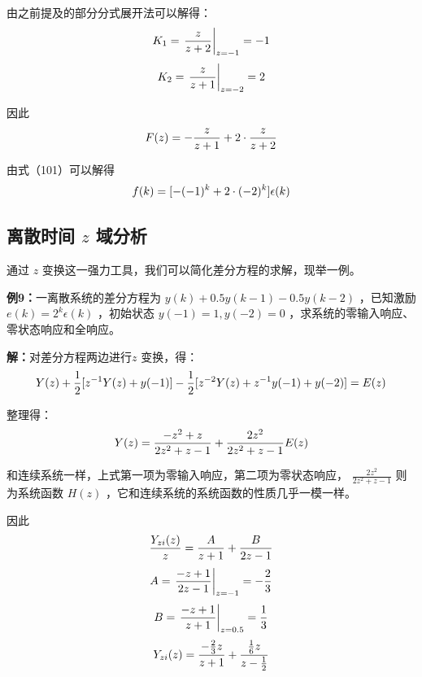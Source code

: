 \documentclass[UTF8,a4paper,11pt]{article}
\begin{document}
由之前提及的部分分式展开法可以解得：
\begin{equation}
K_1=\left. \frac{z}{z+2} \right| _{z=-1}=-1
\notag
\end{equation}
\begin{equation}
K_2=\left. \frac{z}{z+1} \right| _{z=-2}=2
\notag
\end{equation}

因此
\begin{equation}
F(z)=-\frac{z}{z+1}+2\cdot\frac{z}{z+2}
\notag
\end{equation}

由式（101）可以解得
\begin{equation}
f(k)=[-(-1)^k+2\cdot(-2)^k]\epsilon(k)
\notag
\end{equation}

\subsection{离散时间 $z$ 域分析}
通过 $z$ 变换这一强力工具，我们可以简化差分方程的求解，现举一例。

\textbf{例9：}一离散系统的差分方程为 $y(k)+0.5y(k-1)-0.5y(k-2)$ ，已知激励 $e(k)=2^k\epsilon(k)$ ，初始状态 $y(-1)=1, y(-2)=0$ ，求系统的零输入响应、零状态响应和全响应。

\textbf{解：}对差分方程两边进行$z$ 变换，得：
\begin{equation}
Y(z)+\frac{1}{2}[z^{-1}Y(z)+y(-1)]-\frac{1}{2}[z^{-2}Y(z)+z^{-1}y(-1)+y(-2)]=E(z)
\notag
\end{equation}

整理得：
\begin{equation}
Y(z)=\frac{-z^2+z}{2z^2+z-1}+\frac{2z^2}{2z^2+z-1}E(z)
\notag
\end{equation}

和连续系统一样，上式第一项为零输入响应，第二项为零状态响应， $\frac{2z^2}{2z^2+z-1}$ 则为系统函数 $H(z)$  ，它和连续系统的系统函数的性质几乎一模一样。

因此
\begin{equation}
\frac{Y_{zi}(z)}{z}=\frac{A}{z+1}+\frac{B}{2z-1}
\notag
\end{equation}
\begin{equation}
A=\left. \frac{-z+1}{2z-1} \right| _{z=-1}=-\frac{2}{3}
\notag
\end{equation}
\begin{equation}
B=\left. \frac{-z+1}{z+1} \right| _{z=0.5}=\frac{1}{3}
\notag
\end{equation}
\begin{equation}
Y_{zi}(z)=\frac{-\frac{2}{3}z}{z+1}+\frac{\frac{1}{6}z}{z-\frac{1}{2}}
\notag
\end{equation}
\end{document}
